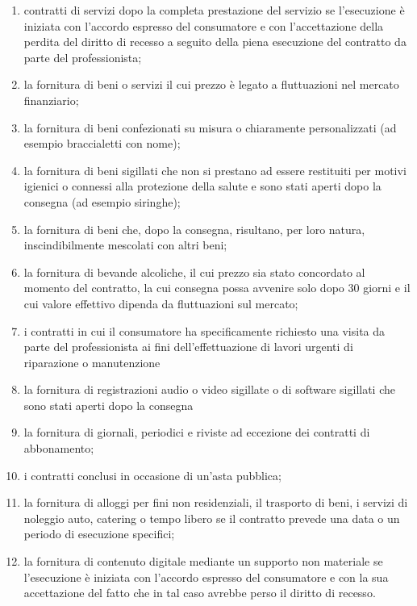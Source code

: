 \begin{enumerate}
    \item contratti di servizi dopo la completa prestazione del servizio se
        l'esecuzione è iniziata con l'accordo espresso del consumatore e con
        l'accettazione della perdita del diritto di recesso a seguito della
        piena esecuzione del contratto da parte del professionista;
    \item la fornitura di beni o servizi il cui prezzo è legato a fluttuazioni
        nel mercato finanziario;
    \item la fornitura di beni confezionati su misura o chiaramente
        personalizzati (ad esempio braccialetti con nome);
    \item la fornitura di beni sigillati che non si prestano ad essere
        restituiti per motivi igienici o connessi alla protezione della salute
        e sono stati aperti dopo la consegna (ad esempio siringhe);
    \item la fornitura di beni che, dopo la consegna, risultano, per loro
        natura, inscindibilmente mescolati con altri beni;
    \item la fornitura di bevande alcoliche, il cui prezzo sia stato concordato
        al momento del contratto, la cui consegna possa avvenire solo dopo 30
        giorni e il cui valore effettivo dipenda da fluttuazioni sul mercato;
    \item i contratti in cui il consumatore ha specificamente richiesto una
        visita da parte del professionista ai fini dell'effettuazione di lavori
        urgenti di riparazione o manutenzione
    \item la fornitura di registrazioni audio o video sigillate o di software
        sigillati che sono stati aperti dopo la consegna
    \item la fornitura di giornali, periodici e riviste ad eccezione dei contratti di abbonamento;
    \item i contratti conclusi in occasione di un'asta pubblica;
    \item la fornitura di alloggi per fini non residenziali, il trasporto di
        beni, i servizi di noleggio auto, catering o tempo libero se il
        contratto prevede una data o un periodo di esecuzione specifici;
    \item la fornitura di contenuto digitale mediante un supporto non materiale
        se l'esecuzione è iniziata con l'accordo espresso del consumatore e con
        la sua accettazione del fatto che in tal caso avrebbe perso il diritto
        di recesso.
\end{enumerate}

